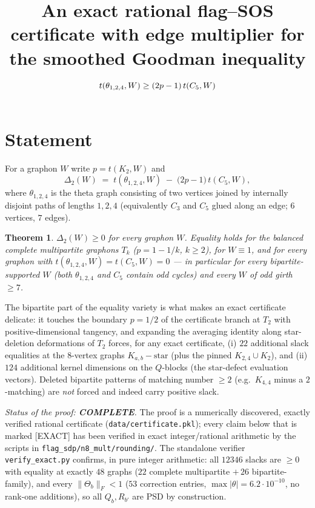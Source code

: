 \documentclass[11pt]{amsart}
\title[An exact certificate for the smoothed Goodman inequality]{An exact
rational flag--SOS certificate with edge multiplier for the smoothed Goodman
inequality $t(\thet,W)\ge (2p-1)\,t(C_5,W)$}
\newtheorem{theorem}{Theorem}
\newcommand{\thet}{\theta_{1,2,4}}
\newcommand{\Wone}{W\!\equiv\!1}
\begin{document}
\maketitle

\section{Statement}

For a graphon $W$ write $p=t(K_2,W)$ and
\[
\Delta_2(W) \;=\; t(\thet,W)\;-\;\bigl(2p-1\bigr)\,t(C_5,W),
\]
where $\thet$ is the theta graph consisting of two vertices joined by
internally disjoint paths of lengths $1,2,4$ (equivalently $C_3$ and $C_5$
glued along an edge; $6$ vertices, $7$ edges).

\begin{theorem}\label{thm:main}
$\Delta_2(W)\ge 0$ for every graphon $W$.  Equality holds for the balanced
complete multipartite graphons $T_k$ ($p=1-1/k$, $k\ge2$), for $\Wone$, and
for every graphon with $t(\thet,W)=t(C_5,W)=0$ --- in particular for
\emph{every bipartite-supported} $W$ (both $\thet$ and $C_5$ contain odd
cycles) and every $W$ of odd girth $\ge 7$.
\end{theorem}

The bipartite part of the equality variety is what makes an exact
certificate delicate: it touches the boundary $p=1/2$ of the certificate
branch at $T_2$ with positive-dimensional tangency, and expanding the
averaging identity along star-deletion deformations of $T_2$ forces, for
any exact certificate, (i) $22$ additional slack equalities at the
$8$-vertex graphs $K_{a,b}-\mathrm{star}$ (plus the pinned
$K_{2,4}\cup K_2$), and (ii) $124$ additional kernel dimensions on the
$Q$-blocks (the star-defect evaluation vectors).  Deleted bipartite
patterns of matching number $\ge2$ (e.g.\ $K_{4,4}$ minus a $2$-matching)
are \emph{not} forced and indeed carry positive slack.

\emph{Status of the proof: \textbf{COMPLETE}.}  The proof is a numerically
discovered, exactly verified rational certificate
(\texttt{data/certificate.pkl}); every claim below that is marked
[EXACT] has been verified in exact integer/rational arithmetic by the
scripts in \texttt{flag\_sdp/n8\_mult/rounding/}.  The standalone verifier
\texttt{verify\_exact.py} confirms, in pure integer arithmetic: all $12346$
slacks are $\ge 0$ with equality at exactly $48$ graphs ($22$ complete
multipartite $+\,26$ bipartite-family), and every $\|\Theta_b\|_F<1$
($53$ correction entries, $\max|\theta|=6.2\cdot10^{-10}$, no rank-one
additions), so all $Q_b,R_{b'}$ are PSD by construction.
\end{document}
